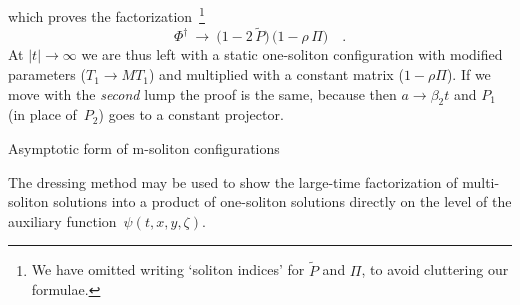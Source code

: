 \documentclass[a4paper,11pt]{article}
\makeatletter
\renewcommand{\section}{\@startsection{section}{1}{0pt}{\medskipamount}
{\medskipamount}{\large\bf}}
\numberwithin{equation}{section}
\def\b{\beta}
\newcommand{\Pt}{\widetilde{P}}
\makeatother
\begin{document}
which proves the factorization~\footnote{
We have omitted writing `soliton indices' for $\Pt$ and $\Pi$, to avoid
cluttering our formulae.}
\begin{equation} 
\Phi^{\dagger}\ \to\ \bigl(1-2\,\Pt\bigr)\,\bigl(1-\rho\,\Pi\bigr) \quad.
\end{equation}
At $|t|\to\infty$ we are thus left with a static one-soliton configuration
with modified parameters ($T_1\to MT_1$) and multiplied with a constant matrix
($1{-}\rho\Pi$).
If we move with the {\it second\/} lump the proof is the same, because then 
$a\to\b_2 t$ and $P_1$ (in place of~$P_2$) goes to a constant projector.


\section{Asymptotic form of m-soliton configurations}

\noindent
The dressing method may be used to show the large-time factorization
of multi-soliton solutions into a product of one-soliton solutions
directly on the level of the auxiliary function~$\psi(t,x,y,\zeta)$.
\end{document}
